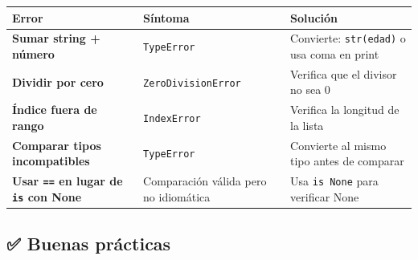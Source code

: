 \documentclass[
  doc,
  floatsintext,
  longtable,
  a4paper,
  nolmodern,
  notxfonts,
  notimes,
  12pt,
  colorlinks=true,linkcolor=blue,citecolor=blue,urlcolor=blue]{apa7}
\newcounter{none} %
\begin{document}
{\def\LTcaptype{none} %
\begin{longtable}[]{@{}
  >{\raggedright\arraybackslash}p{}
  >{\raggedright\arraybackslash}p{}
  >{\raggedright\arraybackslash}p{}@{}}
\toprule\noalign{}
\begin{minipage}[b]{\linewidth}\raggedright
Error
\end{minipage} & \begin{minipage}[b]{\linewidth}\raggedright
Síntoma
\end{minipage} & \begin{minipage}[b]{\linewidth}\raggedright
Solución
\end{minipage} \\
\midrule\noalign{}
\endhead
\bottomrule\noalign{}
\endlastfoot
\textbf{Sumar string + número} & \texttt{TypeError} & Convierte:
\texttt{str(edad)} o usa coma en print \\
\textbf{Dividir por cero} & \texttt{ZeroDivisionError} & Verifica que el
divisor no sea 0 \\
\textbf{Índice fuera de rango} & \texttt{IndexError} & Verifica la
longitud de la lista \\
\textbf{Comparar tipos incompatibles} & \texttt{TypeError} & Convierte
al mismo tipo antes de comparar \\
\textbf{Usar \texttt{==} en lugar de \texttt{is} con None} & Comparación
válida pero no idiomática & Usa \texttt{is\ None} para verificar None \\
\end{longtable}
}

\subsection{✅ Buenas prácticas}\label{buenas-pruxe1cticas}
\end{document}
